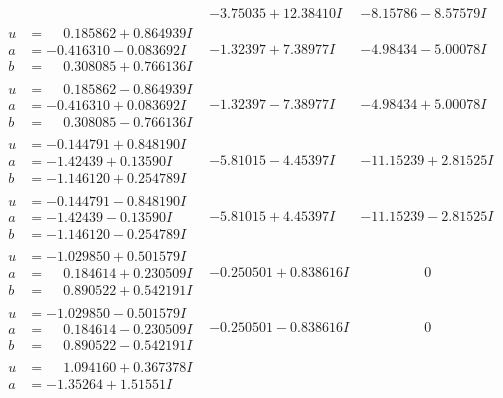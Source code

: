 \documentclass[1p]{elsarticle_modified}
\theoremstyle{definition}
\begin{document}
$$\begin{array}{c|c|c}
 & -3.75035 + 12.38410 I & -8.15786 - 8.57579 I \\ \hline\begin{aligned}
u &= \phantom{-}0.185862 + 0.864939 I \\
a &= -0.416310 - 0.083692 I \\
b &= \phantom{-}0.308085 + 0.766136 I\end{aligned}
 & -1.32397 + 7.38977 I & -4.98434 - 5.00078 I \\ \hline\begin{aligned}
u &= \phantom{-}0.185862 - 0.864939 I \\
a &= -0.416310 + 0.083692 I \\
b &= \phantom{-}0.308085 - 0.766136 I\end{aligned}
 & -1.32397 - 7.38977 I & -4.98434 + 5.00078 I \\ \hline\begin{aligned}
u &= -0.144791 + 0.848190 I \\
a &= -1.42439 + 0.13590 I \\
b &= -1.146120 + 0.254789 I\end{aligned}
 & -5.81015 - 4.45397 I & -11.15239 + 2.81525 I \\ \hline\begin{aligned}
u &= -0.144791 - 0.848190 I \\
a &= -1.42439 - 0.13590 I \\
b &= -1.146120 - 0.254789 I\end{aligned}
 & -5.81015 + 4.45397 I & -11.15239 - 2.81525 I \\ \hline\begin{aligned}
u &= -1.029850 + 0.501579 I \\
a &= \phantom{-}0.184614 + 0.230509 I \\
b &= \phantom{-}0.890522 + 0.542191 I\end{aligned}
 & -0.250501 + 0.838616 I & \phantom{-0.000000 } 0 \\ \hline\begin{aligned}
u &= -1.029850 - 0.501579 I \\
a &= \phantom{-}0.184614 - 0.230509 I \\
b &= \phantom{-}0.890522 - 0.542191 I\end{aligned}
 & -0.250501 - 0.838616 I & \phantom{-0.000000 } 0 \\ \hline\begin{aligned}
u &= \phantom{-}1.094160 + 0.367378 I \\
a &= -1.35264 + 1.51551 I \\

\end{aligned}
\end{array}$$
\end{document}

